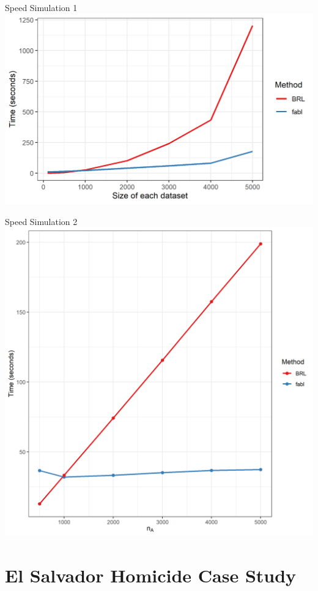 \documentclass{beamer}
\begin{document}
	\begin{frame}{Speed Simulation 1}
	\includegraphics[width = \textwidth, height = .7\textwidth ]{../notes/figures/sadinle_speed_plot2.png}
\end{frame}

	\begin{frame}{Speed Simulation 2}
	\includegraphics[width = \textwidth, height = .7\textwidth ]{../notes/figures/speed_plot_fixed_nB.png}
\end{frame}

\section{El Salvador Homicide Case Study}
\end{document}
